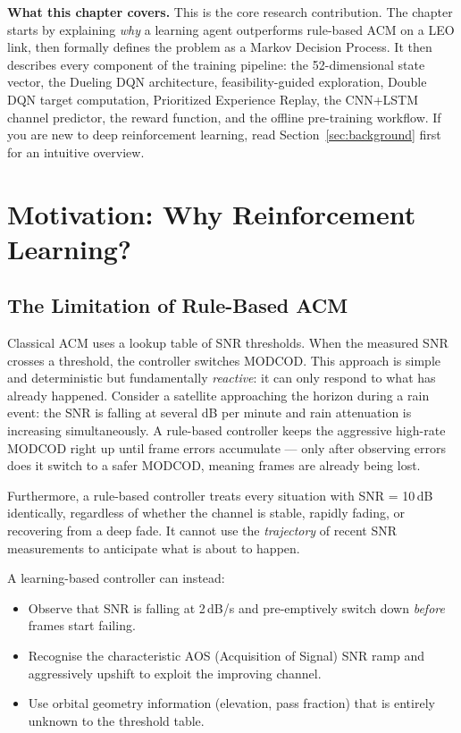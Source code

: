 \documentclass[12pt,a4paper]{report}
\begin{document}
\begin{keyinsight}
\textbf{What this chapter covers.}
This is the core research contribution.  The chapter starts by explaining
\emph{why} a learning agent outperforms rule-based ACM on a LEO link, then
formally defines the problem as a Markov Decision Process.  It then describes
every component of the training pipeline: the 52-dimensional state vector,
the Dueling DQN architecture, feasibility-guided exploration, Double DQN
target computation, Prioritized Experience Replay, the CNN+LSTM channel
predictor, the reward function, and the offline pre-training workflow.
If you are new to deep reinforcement learning, read Section~\ref{sec:background}
first for an intuitive overview.
\end{keyinsight}

\section{Motivation: Why Reinforcement Learning?}

\subsection{The Limitation of Rule-Based ACM}

Classical ACM uses a lookup table of SNR thresholds. When the measured SNR
crosses a threshold, the controller switches MODCOD. This approach is simple
and deterministic but fundamentally \emph{reactive}: it can only respond to
what has already happened. Consider a satellite approaching the horizon during
a rain event: the SNR is falling at several dB per minute and rain attenuation
is increasing simultaneously. A rule-based controller keeps the aggressive
high-rate MODCOD right up until frame errors accumulate --- only after observing
errors does it switch to a safer MODCOD, meaning frames are already being lost.

Furthermore, a rule-based controller treats every situation with SNR = 10\,dB
identically, regardless of whether the channel is stable, rapidly fading, or
recovering from a deep fade. It cannot use the \emph{trajectory} of recent
SNR measurements to anticipate what is about to happen.

A learning-based controller can instead:
\begin{itemize}[nosep]
    \item Observe that SNR is falling at 2\,dB/s and pre-emptively switch
          down \emph{before} frames start failing.
    \item Recognise the characteristic AOS (Acquisition of Signal) SNR ramp
          and aggressively upshift to exploit the improving channel.
    \item Use orbital geometry information (elevation, pass fraction) that is
          entirely unknown to the threshold table.
\end{itemize}
\end{document}
